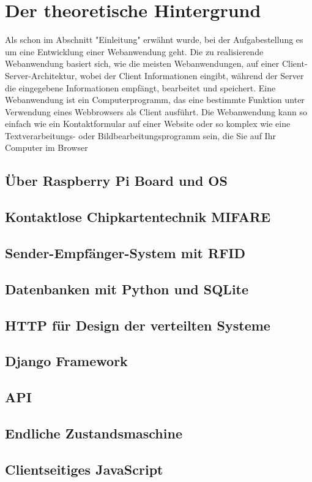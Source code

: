 \chapter{Der theoretische Hintergrund}
\label{sec:theorie}
Als schon im Abschnitt "Einleitung" erwähnt wurde, bei der Aufgabestellung es um eine Entwicklung einer Webanwendung geht. Die zu realisierende Webanwendung basiert sich, wie die meisten Webanwendungen, auf einer Client-Server-Architektur, wobei der Client Informationen eingibt, während der Server die eingegebene Informationen empfängt, bearbeitet und speichert.
Eine Webanwendung ist ein Computerprogramm, das eine bestimmte Funktion unter Verwendung eines Webbrowsers als Client ausführt. Die Webanwendung kann so einfach wie ein Kontaktformular auf einer Website oder so komplex wie eine Textverarbeitungs- oder Bildbearbeitungsprogramm sein, die Sie auf Ihr Computer im Browser

\section{Über Raspberry Pi Board und OS}
\label{sec:theorie:raspberry}

\section{Kontaktlose Chipkartentechnik MIFARE}
\label{sec:theorie:mifare}

\section{Sender-Empfänger-System mit RFID}
\label{sec:theorie:rfid}

\section{Datenbanken mit Python und SQLite}
\label{sec:theorie:db}

\section{HTTP für Design der verteilten Systeme}
\label{sec:theorie:http}

\section{Django Framework}
\label{sec:theorie:about_django}

\section{API}
\label{sec:theorie:api}

\section{Endliche Zustandsmaschine}
\label{sec:theorie:fsm}

\section{Clientseitiges JavaScript}
\label{sec:theorie:js}




